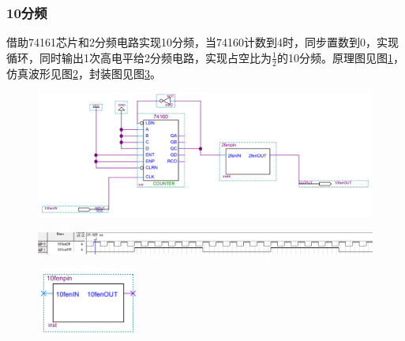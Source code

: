 \documentclass[12pt]{article}
\begin{document}
\subsubsection{10分频}
借助74161芯片和2分频电路实现10分频，当74160计数到4时，同步置数到0，实现循环，同时输出1次高电平给2分频电路，实现占空比为$\frac{1}{2}$的10分频。原理图见图\ref{fig:10fenpin}，仿真波形见图\ref{fig:fangzhen10fenpin}，封装图见图\ref{fig:fengzhuang10fenpin}。
\begin{figure}[hp]
	\centering  
	\includegraphics[width=\textwidth]{picture/10fenpin.png} 
	\caption{}
	\label{fig:10fenpin}   
\end{figure}
\begin{figure}[hp]
	\centering  
	\includegraphics[width=\textwidth]{picture/TIM20181210165821.png} 
	\caption{}
	\label{fig:fangzhen10fenpin}   
\end{figure}
\begin{figure}[hp]
	\centering  
	\includegraphics[width=0.3\textwidth]{picture/fenzhuang10fenp.png} 
	\caption{}
	\label{fig:fengzhuang10fenpin}   
\end{figure}
\end{document}
